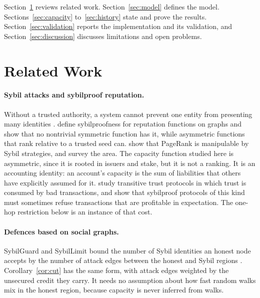 \documentclass[acmsmall,nonacm,screen]{acmart}
\theoremstyle{acmdefinition}%
\begin{document}
Section~\ref{sec:related} reviews related work. Section~\ref{sec:model} defines the model.
Sections~\ref{sec:capacity} to~\ref{sec:history} state and prove the results.
Section~\ref{sec:validation} reports the implementation and its validation, and
Section~\ref{sec:discussion} discusses limitations and open problems.

\section{Related Work}\label{sec:related}

\paragraph{Sybil attacks and sybilproof reputation.} Without a trusted authority, a system cannot
prevent one entity from presenting many identities \citep{douceur2002sybil}.
\citet{cheng2005sybilproof} define sybilproofness for reputation functions on graphs and show that
no nontrivial symmetric function has it, while asymmetric functions that rank relative to a trusted
seed can. \citet{cheng2006pagerank} show that PageRank is manipulable by Sybil strategies, and
\citet{friedman2007manipulation} survey the area. The capacity function studied here is asymmetric,
since it is rooted in issuers and stake, but it is not a ranking. It is an accounting identity: an
account's capacity is the sum of liabilities that others have explicitly assumed for it.
\citet{resnick2009transitive} study transitive trust protocols in which trust is consumed by bad
transactions, and show that sybilproof protocols of this kind must sometimes refuse transactions
that are profitable in expectation. The one-hop restriction below is an instance of that cost.

\paragraph{Defences based on social graphs.} SybilGuard and SybilLimit bound the number of Sybil
identities an honest node accepts by the number of attack edges between the honest and Sybil
regions \citep{yu2006sybilguard,yu2008sybillimit}. Corollary~\ref{cor:cut} has the same form, with
attack edges weighted by the unsecured credit they carry. It needs no assumption about how fast
random walks mix in the honest region, because capacity is never inferred from walks.
\end{document}
